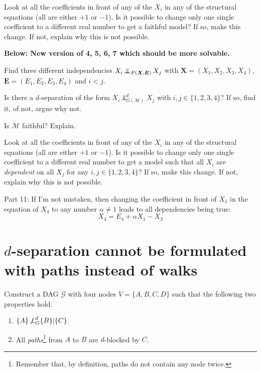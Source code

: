 \documentclass[11pt,a4paper]{article}
\begin{document}
\begin{enumerate}
{  \item Look at all the coefficients in front of any of the $X_i$ in any of the structural equations (all are either $+1$ or $-1$).
    Is it possible to change only one single coefficient to a different real number to get a faithful model? 
    If so, make this change. 
  If not, explain why this is not possible.} \textbf{Below: New version of 4, 5, 6, 7 which should be more solvable.}
\item Find three different independencies $X_i \operatorname*{\perp\mkern-11mu\perp}_{P(\boldsymbol{X}, \boldsymbol{E})} X_j$ with $\boldsymbol{X} = (X_1, X_2, X_3, X_4)$, $\boldsymbol{E} = (E_1, E_2, E_3, E_4)$ and $i < j$.
\item Is there a $d$-separation of the form  $X_i \Perp^d_{G(\mathcal{M})} X_j$ with $i, j \in \{1, 2, 3, 4\}$?
  If so, find it, of not, argue why not.
\item Is $\mathcal{M}$ faithful? Explain.
\item Look at all the coefficients in front of any of the $X_i$ in any of the structural equations (all are either $+1$ or $-1$).
  Is it possible to change only one single coefficient to a different real number to get a model such that all $X_i$ are \emph{dependent} on all $X_j$ for any $i, j \in \{1, 2, 3, 4\}$?
    If so, make this change. 
    If not, explain why this is not possible.
\end{enumerate}

\begin{gradedsolution}
  Part 11: If I'm not mistaken, then changing the coefficient in front of $X_1$ in the equation of $X_4$ to any number $\alpha \neq 1$ leads to all dependencies being true:
  \begin{equation*}
         X_4 = E_4 + \alpha X_1 - X_3
  \end{equation*}
\end{gradedsolution}


\section{$d$-separation cannot be formulated with paths instead of walks}

Construct a DAG $\mathcal{G}$ with four nodes $V = \{A, B, C, D\}$ such that the following two properties hold:
\begin{enumerate}
  \item  $\{A\} \operatorname*{\not\perp}_G^d \{B\} | \{C\}$. 
  \item  All \emph{paths}\footnote{Remember that, by definition, paths do not contain any node twice.} from $A$ to $B$ are $d$-blocked by $C$. 
\end{enumerate}
\end{document}
